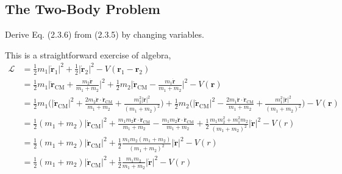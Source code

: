 \documentclass[../principles-of-quantum-mechanics.tex]{subfiles}
\begin{document}
\begin{questions}
		\subsection{The Two-Body Problem}
		\question Derive Eq. (2.3.6) from (2.3.5) by changing variables.
		
		\begin{solution}
			This is a straightforward exercise of algebra,
			\begin{align*}
			\mathcal{L} &= \frac{1}{2}m_1|\dot{\mathbf{r}}_1|^2 + \frac{1}{2}|\dot{\mathbf{r}}_2|^2 - V(\mathbf{r}_1 - \mathbf{r}_2) \\
			&= \frac{1}{2}m_1\Big|\dot{\mathbf{r}}_{\mathrm{CM}} + \frac{m_2\dot{\mathbf{r}}}{m_1+m_2}\Big|^2 + \frac{1}{2}m_2\Big|\dot{\mathbf{r}}_{\mathrm{CM}} - \frac{m_1\dot{\mathbf{r}}}{m_1+m_2}\Big|^2 - V(\mathbf{r}) \\
			&= \frac{1}{2}m_1\Big(|\dot{\mathbf{r}}_{\mathrm{CM}}|^2 + \frac{2m_2\dot{\mathbf{r}}\cdot\dot{\mathbf{r}}_{\mathrm{CM}}}{m_1+m_2} + \frac{m_2^2|\dot{\mathbf{r}}|^2}{(m_1+m_2)^2}\Big) +  \frac{1}{2}m_2\Big(|\dot{\mathbf{r}}_{\mathrm{CM}}|^2 - \frac{2m_1\dot{\mathbf{r}}\cdot\dot{\mathbf{r}}_{\mathrm{CM}}}{m_1+m_2} + \frac{m_1^2|\dot{\mathbf{r}}|^2}{(m_1+m_2)^2}\Big) - V(\mathbf{r}) \\
			&= \frac{1}{2}(m_1+m_2)|\dot{\mathbf{r}}_{\mathrm{CM}}|^2 + \frac{m_1m_2\dot{\mathbf{r}}\cdot\dot{\mathbf{r}}_{\mathrm{CM}}}{m_1+m_2} - \frac{m_1m_2\dot{\mathbf{r}}\cdot\dot{\mathbf{r}}_{\mathrm{CM}}}{m_1+m_2} + \frac{1}{2}\frac{m_1m_2^2 + m_1^2m_2}{(m_1+m_2)^2}|\dot{\mathbf{r}}|^2 - V(r) \\
			&= \frac{1}{2}(m_1+m_2)|\dot{\mathbf{r}}_{\mathrm{CM}}|^2 + \frac{1}{2}\frac{m_1m_2(m_1 + m_2)}{(m_1+m_2)^2}|\dot{\mathbf{r}}|^2 - V(r) \\
			&= \frac{1}{2}(m_1+m_2)|\dot{\mathbf{r}}_{\mathrm{CM}}|^2 + \frac{1}{2}\frac{m_1m_2}{m_1+m_2}|\dot{\mathbf{r}}|^2 - V(r)
			\end{align*}
		\end{solution}
	
		\setcounter{subsection}{4}
		\setcounter{question}{0}

\end{questions}
\end{document}
